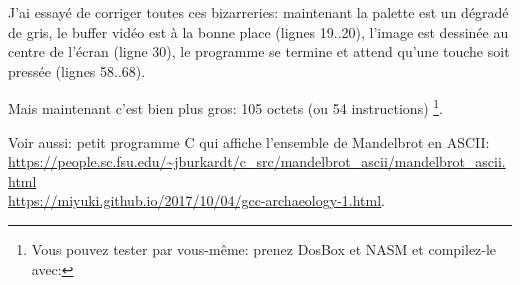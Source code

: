 J'ai essayé de corriger toutes ces bizarreries: maintenant la palette est un dégradé
de gris, le buffer vidéo est à la bonne place (lignes 19..20),
l'image est dessinée au centre de l'écran (ligne 30), le programme se termine et
attend qu'une touche soit pressée (lignes 58..68).

Mais maintenant c'est bien plus gros: 105 octets (ou 54 instructions)
\footnote{
Vous pouvez tester par vous-même: prenez DosBox et NASM et compilez-le avec:
}.

\begin{figure}[H]
\centering
{}
\caption{\MyFixedVersion}
\label{fig:mandelbrot_fixed}
\end{figure}

Voir aussi: petit programme C qui affiche l'ensemble de Mandelbrot en ASCII:
\url{https://people.sc.fsu.edu/~jburkardt/c_src/mandelbrot_ascii/mandelbrot_ascii.html} \\
\url{https://miyuki.github.io/2017/10/04/gcc-archaeology-1.html}.
